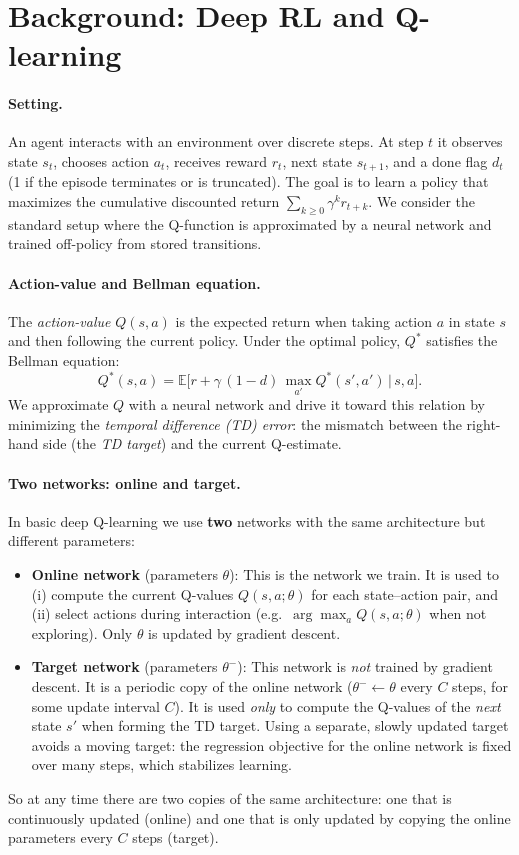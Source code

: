 \documentclass[11pt]{article}
\begin{document}
\section{Background: Deep RL and Q-learning}

\paragraph{Setting.} An agent interacts with an environment over discrete steps. At step $t$ it observes state $s_t$, chooses action $a_t$, receives reward $r_t$, next state $s_{t+1}$, and a done flag $d_t$ (1 if the episode terminates or is truncated). The goal is to learn a policy that maximizes the cumulative discounted return $\sum_{k\ge 0} \gamma^k r_{t+k}$. We consider the standard setup where the Q-function is approximated by a neural network and trained off-policy from stored transitions.

\paragraph{Action-value and Bellman equation.} The \emph{action-value} $Q(s,a)$ is the expected return when taking action $a$ in state $s$ and then following the current policy. Under the optimal policy, $Q^*$ satisfies the Bellman equation:
\begin{equation}
Q^*(s,a) = \mathbb{E}\bigl[ r + \gamma\,(1-d)\,\max_{a'} Q^*(s',a') \,\big|\, s,a \bigr].
\end{equation}
We approximate $Q$ with a neural network and drive it toward this relation by minimizing the \emph{temporal difference (TD) error}: the mismatch between the right-hand side (the \emph{TD target}) and the current Q-estimate.

\paragraph{Two networks: online and target.} In basic deep Q-learning we use \textbf{two} networks with the same architecture but different parameters:
\begin{itemize}
\item \textbf{Online network} (parameters $\theta$): This is the network we train. It is used to (i) compute the current Q-values $Q(s,a;\theta)$ for each state--action pair, and (ii) select actions during interaction (e.g.\ $\arg\max_a Q(s,a;\theta)$ when not exploring). Only $\theta$ is updated by gradient descent.
\item \textbf{Target network} (parameters $\theta^-$): This network is \emph{not} trained by gradient descent. It is a periodic copy of the online network ($\theta^- \leftarrow \theta$ every $C$ steps, for some update interval $C$). It is used \emph{only} to compute the Q-values of the \emph{next} state $s'$ when forming the TD target. Using a separate, slowly updated target avoids a moving target: the regression objective for the online network is fixed over many steps, which stabilizes learning.
\end{itemize}
So at any time there are two copies of the same architecture: one that is continuously updated (online) and one that is only updated by copying the online parameters every $C$ steps (target).
\end{document}
